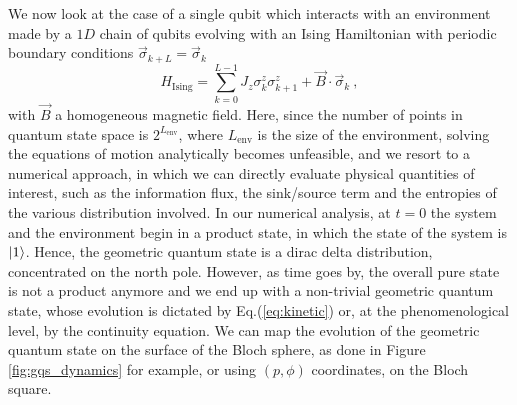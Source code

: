 \documentclass[draft,nofootinbib,pre,twocolumn,showpacs,showkeys,preprintnumbers,floatfix]{revtex4-1}
\newcommand{\1}{\mathbbm{1}}
\begin{document}
We now look at the case of a single qubit which interacts with an environment 
made by a $1D$ chain of qubits evolving with an Ising Hamiltonian with periodic
boundary conditions $\vec{\sigma}_{k+L}= \vec{\sigma}_k$
\begin{equation}
H_{\mathrm{Ising}} = \sum_{k=0}^{L-1} J_z \sigma_k^z \sigma_{k+1}^{z} + \vec{B} \cdot \vec{\sigma}_k~,
\end{equation}
with $\vec{B}$ a homogeneous magnetic field. Here, since the number of points
in quantum state space is $2^{L_{\mathrm{env}}}$, where $L_{\mathrm{env}}$
is the size of the environment, solving the equations of motion analytically becomes
unfeasible, and we resort to a numerical approach, in which we can directly evaluate
physical quantities of interest, such as the information flux, the sink/source term and
the entropies of the various distribution involved. In our numerical analysis, at $t=0$
the system and the environment begin in a product state, in which the state of the system
is $\ket{1}$. Hence, the geometric quantum state is a dirac delta distribution, concentrated 
on the north pole. However, as time goes by, the overall pure state is not a product anymore
and we end up with a non-trivial geometric quantum state, whose evolution
is dictated by Eq.(\ref{eq:kinetic}) or, at the phenomenological level, by the continuity equation. 
We can map the evolution of the geometric quantum state on the surface of the Bloch sphere, 
as done in Figure \ref{fig:gqs_dynamics} for example, or using $(p,\phi)$ coordinates, on the 
Bloch square. 
\end{document}
